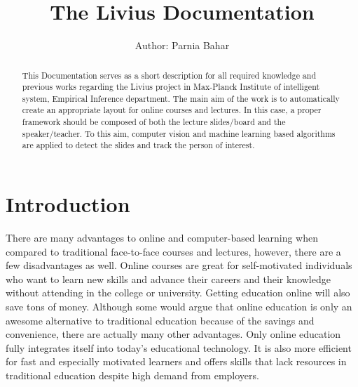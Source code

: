 \documentclass[[12pt,DIV14,BCOR12mm,a4paper,footexclude,headinclude,halfparskip-,twoside,openright,cleardoubleempty,idxtotoc,bibtotoc]{article}
\begin{document}
\title{The Livius Documentation}
\author{Author: Parnia Bahar}

\maketitle

\begin{abstract}
This Documentation serves as a short description for all required knowledge and previous works regarding the Livius project in Max-Planck Institute of intelligent system, Empirical Inference department. The main aim of the work is to automatically create an appropriate layout for online courses and lectures.  In this case, a proper framework should be composed of both the lecture slides/board and the speaker/teacher. To this aim, computer vision and machine learning  based algorithms are applied to detect the slides and track the person of interest.
\end{abstract}

\section{Introduction}

There are many advantages to online and computer-based learning when compared to traditional face-to-face courses and lectures, however, there are a few disadvantages as well.
Online courses are great for self-motivated individuals who want to learn new skills and advance their careers and their knowledge without attending in the college or university. Getting education online will also save tons of money. Although some would argue that online education is only an awesome alternative to traditional education because of the savings and convenience, there are actually many other advantages. Only online education fully integrates itself into today’s educational technology. It is also more efficient for fast and especially motivated learners and offers skills that lack resources in traditional education despite high demand from employers. 
\end{document}
